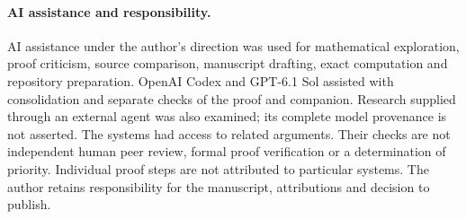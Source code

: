 \documentclass[11pt,a4paper]{article}
\theoremstyle{remark}
\begin{document}
\paragraph{AI assistance and responsibility.}
AI assistance under the author's direction was used for mathematical
exploration, proof criticism, source comparison, manuscript drafting,
exact computation and repository preparation. OpenAI Codex and GPT-6.1 Sol
assisted with consolidation and separate checks of the proof and companion.
Research supplied through an external agent was also examined; its complete
model provenance is not asserted. The systems had access to related
arguments. Their checks are not independent human peer review, formal proof
verification or a determination of priority. Individual proof steps are not
attributed to particular systems. The author retains responsibility for
the manuscript, attributions and decision to publish.
\end{document}
